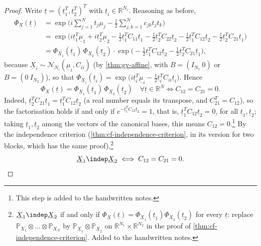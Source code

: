 \begin{proof}
Write $\underline t=(\underline t_1^T,\underline t_2^T)^T$ with $\underline t_i\in\mathbb R^{N_i}$.
Reasoning as before,
\[
\begin{aligned}
  \Phi_{\underline X}(\underline t)&=\exp\Big(i\sum_{j=1}^Nt_j\mu_j-\frac12\sum_{j,k=1}^Nc_{jk}t_jt_k\Big)\\
  &=\exp\Big(i\underline t_1^T\underline\mu_1+i\underline t_2^T\underline\mu_2
   -\frac12\underline t_1^TC_{11}\underline t_1-\frac12\underline t_2^TC_{22}\underline t_2
   -\frac12\underline t_1^TC_{12}\underline t_2-\frac12\underline t_2^TC_{21}\underline t_1\Big)\\
  &=\Phi_{\underline X_1}(\underline t_1)\,\Phi_{\underline X_2}(\underline t_2)\cdot
   \exp\Big(-\frac12\underline t_1^TC_{12}\underline t_2-\frac12\underline t_2^TC_{21}\underline t_1\Big),
\end{aligned}
\]
because $\underline X_i\sim\mathcal N_{N_i}(\underline\mu_i,C_{ii})$ (by \cref{thm:gv-affine}, with
$B=(I_{N_1}\ 0)$ or $B=(0\ I_{N_2})$), so that
$\Phi_{\underline X_i}(\underline t_i)=\exp\big(i\underline t_i^T\underline\mu_i-\frac12\underline t_i^TC_{ii}\underline t_i\big)$.
Hence
\[
  \Phi_{\underline X}(\underline t)=\Phi_{\underline X_1}(\underline t_1)\,\Phi_{\underline X_2}(\underline t_2)
  \quad\forall\underline t\in\mathbb R^N\iff C_{12}=C_{21}=0 .
\]
Indeed, $\underline t_2^TC_{21}\underline t_1=\underline t_1^TC_{12}\underline t_2$ (a real number
equals its transpose, and $C_{21}^T=C_{12}$), so the factorisation holds if and only if
$e^{-\underline t_1^TC_{12}\underline t_2}=1$, that is, $\underline t_1^TC_{12}\underline t_2=0$, for
all $\underline t_1,\underline t_2$; taking $\underline t_1,\underline t_2$ among the vectors of the
canonical bases, this means $C_{12}=0$.\footnote{This step is added to the handwritten notes.} By the
independence criterion (\cref{thm:cf-independence-criterion}, in its version for two blocks, which
has the same proof),\footnote{$\underline X_1\indep\underline X_2$ if and only if
$\Phi_{\underline X}(\underline t)=\Phi_{\underline X_1}(\underline t_1)\Phi_{\underline X_2}(\underline t_2)$
for every $\underline t$: replace $\mathbb P_{X_1}\otimes\dots\otimes\mathbb P_{X_N}$ by
$\mathbb P_{\underline X_1}\otimes\mathbb P_{\underline X_2}$ on
$\mathbb R^{N_1}\times\mathbb R^{N_2}$ in the proof of \cref{thm:cf-independence-criterion}. Added to
the handwritten notes.}
\[
  \underline X_1\indep\underline X_2\iff C_{12}=C_{21}=0 .\qedhere
\]
\end{proof}

